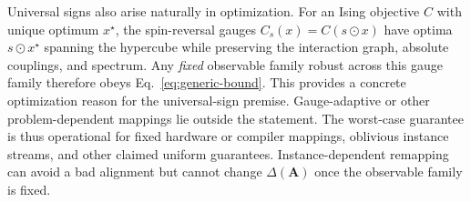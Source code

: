 \documentclass[10pt,aps,pra,twocolumn,superscriptaddress,nofootinbib,longbibliography]{revtex4-2}
\begin{document}
Universal signs also arise naturally in optimization.  For an Ising objective $C$ with unique optimum $x^\star$, the spin-reversal gauges $C_s(x)=C(s\odot x)$ have optima $s\odot x^\star$ spanning the hypercube while preserving the interaction graph, absolute couplings, and spectrum.  Any \emph{fixed} observable family robust across this gauge family therefore obeys Eq.~\eqref{eq:generic-bound}.  This provides a concrete optimization reason for the universal-sign premise.  Gauge-adaptive or other problem-dependent mappings lie outside the statement.  The worst-case guarantee is thus operational for fixed hardware or compiler mappings, oblivious instance streams, and other claimed uniform guarantees.  Instance-dependent remapping can avoid a bad alignment but cannot change $\Delta(\mathbf A)$ once the observable family is fixed.
\end{document}
